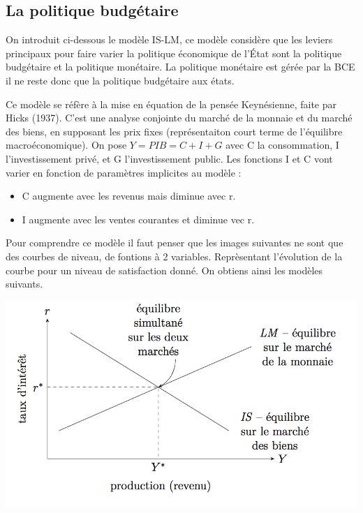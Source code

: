 \subsection{La politique budgétaire} %
\label{sub:la_politique_budgetaire}
On introduit ci-dessous le modèle IS-LM, ce modèle considère que les leviers principaux pour faire varier la politique économique de l'État sont la politique 
budgétaire et la politique monétaire. La politique monétaire est gérée par la BCE il ne reste donc que la politique budgétaire aux états.

\begin{tcolorbox}[title= Modèle IS-LM] 
	Ce modèle se réfère à la mise en équation de la pensée Keynésienne, faite par Hicks (1937). C'est une analyse conjointe du marché de la monnaie et du marché des biens, en supposant les prix fixes (représentaiton court terme de l'équilibre macroéconomique). On pose $Y=PIB=C+I+G$ avec C la consommation, I l'investissement privé, et G l'investissement public. Les fonctions I et C vont varier en fonction de paramètres implicites au modèle :
	\begin{itemize}[label=]
		\item C augmente avec les revenus mais diminue avec r.
		\item I augmente avec les ventes courantes et diminue vec r.
	\end{itemize}
Pour comprendre ce modèle il faut penser que les images suivantes ne sont que des courbes de niveau, de fontions à 2 variables. Reprèsentant l'évolution 
de la courbe pour un niveau de satisfaction donné. On obtiens ainsi les modèles suivants. 

	\begin{center}
		\includegraphics[scale=0.5]{./img/im4}
	\end{center}
  \label{fig:modele_islm}


\end{tcolorbox}
